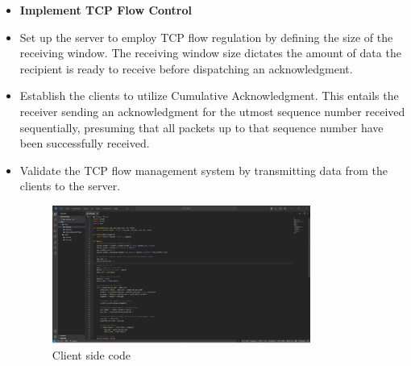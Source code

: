 \documentclass[11pt]{article}
\begin{document}
\begin{itemize}
    \item \textbf{Implement TCP Flow Control}
    \item Set up the server to employ TCP flow regulation by defining the size of the receiving window. The receiving window size dictates the amount of data the recipient is ready to receive before dispatching an acknowledgment.

    \item Establish the clients to utilize Cumulative Acknowledgment. This entails the receiver sending an acknowledgment for the utmost sequence number received sequentially, presuming that all packets up to that sequence number have been successfully received.

    \item Validate the TCP flow management system by transmitting data from the clients to the server.
    
    
   


    \begin{figure}[H]
        \centering
        \includegraphics[width=0.8\textwidth]{Task-1-Client.png}
        \caption{Client side code}
        \label{fig:1}
    \end{figure}
    

\end{itemize}
\end{document}
